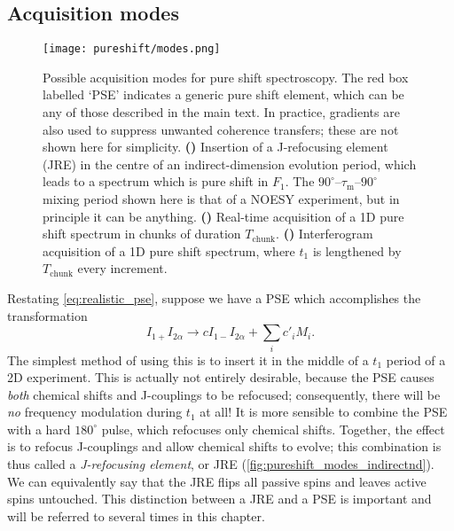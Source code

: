 \subsection{Acquisition modes}
\label{subsec:pureshift__acquisition_modes}

\begin{figure}[htbp]
    \centering
    \texttt{[image: pureshift/modes.png]}%
    {\label{fig:pureshift_modes_indirectnd}}%
    {\label{fig:pureshift_modes_realtime}}%
    {\label{fig:pureshift_modes_interferogram}}%
    \caption[Pure shift acquisition modes]{
        Possible acquisition modes for pure shift spectroscopy.
        The red box labelled `PSE' indicates a generic pure shift element, which can be any of those described in the main text.
        In practice, gradients are also used to suppress unwanted coherence transfers; these are not shown here for simplicity.
        \textbf{()} Insertion of a J-refocusing element (JRE) in the centre of an indirect-dimension evolution period, which leads to a spectrum which is pure shift in $F_1$.
        The $90^\circ$--$\tau_\mathrm{m}$--$90^\circ$ mixing period shown here is that of a NOESY experiment, but in principle it can be anything.
        \textbf{()} Real-time acquisition of a 1D pure shift spectrum in chunks of duration $T_\text{chunk}$.
        \textbf{()} Interferogram acquisition of a 1D pure shift spectrum, where $t_1$ is lengthened by $T_\text{chunk}$ every increment.
    }
    \label{fig:pureshift_modes}
\end{figure}

Restating \cref{eq:realistic_pse}, suppose we have a PSE which accomplishes the transformation
\begin{equation}
    \label{eq:pse_revisited}
    I_{1+}I_{2\alpha} \longrightarrow c I_{1-}I_{2\alpha} + \sum_i c'_i M_i.
\end{equation}
The simplest method of using this is to insert it in the middle of a $t_1$ period of a 2D experiment.
This is actually not entirely desirable, because the PSE causes \textit{both} chemical shifts and J-couplings to be refocused; consequently, there will be \textit{no} frequency modulation during $t_1$ at all!
It is more sensible to combine the PSE with a hard $180^\circ$ pulse, which refocuses only chemical shifts.
Together, the effect is to refocus J-couplings and allow chemical shifts to evolve; this combination is thus called a \textit{J-refocusing element}, or JRE (\cref{fig:pureshift_modes_indirectnd}).
We can equivalently say that the JRE flips all passive spins and leaves active spins untouched.
This distinction between a JRE and a PSE is important and will be referred to several times in this chapter.

